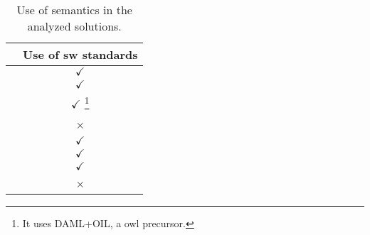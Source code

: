 
\begin{savenotes}
  \begin{table}[htbp]
    \caption{Use of semantics in the analyzed solutions.}
    \centering
    \begin{tabular}{ l c }
      \hline 
      & Use of \ac{sw} standards \\
      \hline 
      \midtsc{} & $\checkmark$ \\
      \midsws{} & $\checkmark$ \\
      \midstuples{} & $\checkmark$ \footnote{It uses DAML+OIL, a \ac{owl} precursor.} \\
      \midcspaces{} & × \\
      \midtscpp{} & $\checkmark$ \\
      \midtripcom{} & $\checkmark$ \\
      \midsmartmt{} & $\checkmark$ \\
      \midnardini{} & × \\
      \hline 
    \end{tabular}
    \label{tab:comparisonSemantics}
  \end{table}
\end{savenotes}

